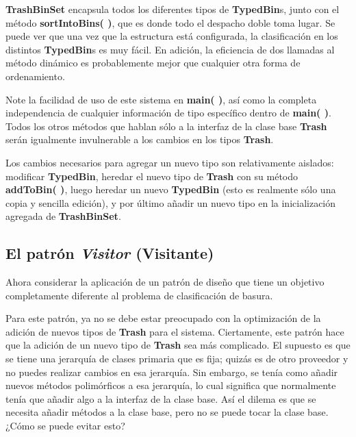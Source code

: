 \textbf{TrashBinSet} encapsula todos los diferentes tipos de \textbf{ TypedBin}s, junto con el método \textbf{sortIntoBins( )}, que es donde todo el despacho doble toma lugar. Se puede ver que una vez que la estructura está configurada, la clasificación en los distintos \textbf{TypedBin}s es muy fácil. En adición, la eficiencia de dos llamadas al método dinámico es probablemente mejor que cualquier otra forma de ordenamiento. \newline

Note la facilidad de uso de este sistema en \textbf{main( )}, así como la completa independencia de cualquier información de tipo específico dentro de \textbf{main( )}. Todos los otros métodos que hablan sólo a la interfaz de la clase base \textbf{Trash} serán igualmente invulnerable a los cambios en los tipos \textbf{Trash}.         \newline

Los cambios necesarios para agregar un nuevo tipo son relativamente aislados: modificar \textbf{TypedBin}, heredar el nuevo tipo de \textbf{Trash} con su método \textbf{addToBin( )}, luego heredar un nuevo \textbf{TypedBin} (esto es realmente sólo una copia y sencilla edición), y por último añadir un nuevo tipo en la inicialización agregada de \textbf{TrashBinSet}.  \newline

\subsection*{El patrón \textit{Visitor} (Visitante)}
\label{subsec:epV}

Ahora considerar la aplicación de un patrón de diseño que tiene un objetivo completamente diferente al problema de clasificación de basura. \newline

Para este patrón, ya no se debe estar preocupado con la optimización de la adición de nuevos tipos de \textbf{Trash} para el sistema. Ciertamente, este patrón hace que la adición de un nuevo tipo de \textbf{Trash} sea más complicado. El supuesto es que se tiene una jerarquía de clases primaria que es fija; quizás es de otro proveedor y no puedes realizar cambios en esa jerarquía. Sin embargo, se tenía como añadir nuevos métodos polimórficos a esa jerarquía, lo cual significa que normalmente tenía que añadir algo a la interfaz de la clase base. Así el dilema es que se necesita añadir métodos a la clase base, pero no se puede tocar la clase base. ¿Cómo se puede evitar esto?  \newline

